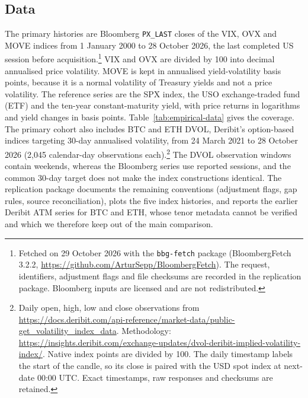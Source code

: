 \subsection{Data}
\label{sec:empirical-data}
The primary histories are Bloomberg \texttt{PX\_LAST} closes of the VIX, OVX and
MOVE indices from 1 January 2000 to 28 October 2026, the last completed US session
before acquisition.\footnote{Fetched on 29 October 2026 with the \texttt{bbg-fetch}
package (BloombergFetch 3.2.2, \url{https://github.com/ArturSepp/BloombergFetch}).
The request, identifiers, adjustment flags and file checksums are recorded in the
replication package. Bloomberg inputs are licensed and are not redistributed.}
VIX and OVX are divided by 100 into decimal annualised price volatility. MOVE is
kept in annualised yield-volatility basis points, because it is a normal
volatility of Treasury yields and not a price volatility. The reference series are
the SPX index, the USO exchange-traded fund (ETF) and the ten-year constant-maturity yield, with price
returns in logarithms and yield changes in basis points. Table~\ref{tab:empirical-data}
gives the coverage.
The primary cohort also includes BTC and ETH DVOL, Deribit's option-based indices
targeting 30-day annualised volatility, from 24 March 2021 to 28 October 2026
(2,045 calendar-day observations each).\footnote{Daily open, high, low and close observations from
\url{https://docs.deribit.com/api-reference/market-data/public-get_volatility_index_data}.
Methodology: \url{https://insights.deribit.com/exchange-updates/dvol-deribit-implied-volatility-index/}.
Native index points are divided by 100. The daily timestamp labels the start of
the candle, so its close is paired with the USD spot index at next-date 00:00 UTC.
Exact timestamps, raw responses and checksums are retained.}
The DVOL observation windows contain weekends,
whereas the Bloomberg series use reported sessions, and the common 30-day target
does not make the index constructions identical.
The replication package documents the remaining conventions (adjustment flags, gap
rules, source reconciliation), plots the five index histories, and reports the earlier
Deribit ATM series for BTC and ETH, whose tenor metadata cannot be verified and which
we therefore keep out of the main comparison.

